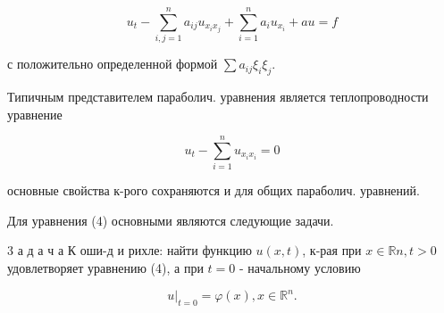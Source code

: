 \documentclass[10pt]{article}
\begin{document}
\[

u_{t}-\sum_{i, j=1}^{n} a_{i j} u_{x_{i} x_{j}}+\sum_{i=1}^{n} a_{i} u_{x_{i}}+a u=f

\]



с положительно определенной формой $\sum a_{i j} \xi_{i} \xi_{j}$.



Типичным представителем параболич. уравнения является теплопроводности уравнение



\[

u_{t}-\sum_{i=1}^{n} u_{x_{i} x_{i}}=0

\]



основные свойства к-рого сохраняются и для общих параболич. уравнений.



Для уравнения (4) основными являются следующие задачи.



3 а д а ч а $К$ оши-д и рихле: найти функцию $u(x, t)$, к-рая при $x \in \mathbb{R} n, t>0$ удовлетворяет уравнению (4), а при $t=0$ - начальному условию



\[

\left.u\right|_{t=0}=\varphi(x), x \in \mathbb{R}^{n} .

\]
\end{document}
